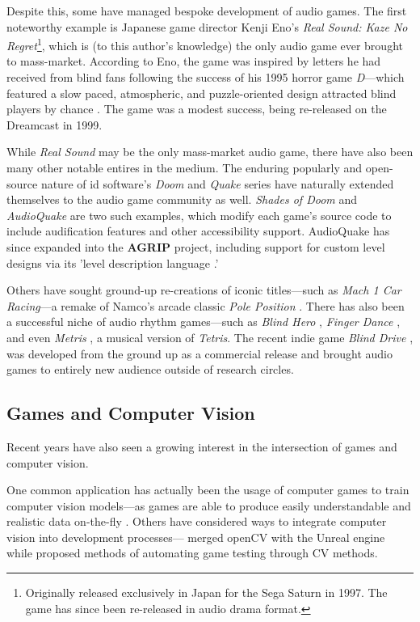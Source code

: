 \documentclass{report}
\newcommand{\tech}[1]{\textbf{#1}}
\begin{document}
Despite this, some have managed bespoke development of audio games. The first noteworthy example is Japanese game director Kenji Eno's \emph{Real Sound: Kaze No Regret}\footnote{Originally released exclusively in Japan for the Sega Saturn in 1997. The game has since been re-released in audio drama format.}, which is (to this author's knowledge) the only audio game ever brought to mass-market. According to Eno, the game was inspired by letters he had received from blind fans following the success of his 1995 horror game \emph{D}---which featured a slow paced, atmospheric, and puzzle-oriented design attracted blind players by chance \cite{Torres_2005}. The game was a modest success, being re-released on the Dreamcast in 1999.

While \emph{Real Sound} may be the only mass-market audio game, there have also been many other notable entires in the medium. The enduring popularly and open-source nature of id software's \emph{Doom} and \emph{Quake} series have naturally extended themselves to the audio game community as well. \emph{Shades of Doom} \cite{GMA_Games} and \emph{AudioQuake} \cite{atkinson2006making} are two such examples, which modify each game's source code to include audification features and other accessibility support. AudioQuake has since expanded into the \tech{AGRIP} project, including support for custom level designs via its 'level description language \cite{Atkinson2009}.'


Others have sought ground-up re-creations of iconic titles---such as \emph{Mach 1 Car Racing}---a remake of Namco's arcade classic \emph{Pole Position} \cite{friberg2004audio}. There has also been a successful niche of audio rhythm games---such as \emph{Blind Hero} \cite{yuan2008blind}, \emph{Finger Dance} \cite{miller2007finger}, and even \emph{Metris} \cite{metris}, a musical version of \emph{Tetris}. The recent indie game \emph{Blind Drive} \cite{blinddrive}, was developed from the ground up as a commercial release and brought audio games to entirely new audience outside of research circles.

\subsection{Games and Computer Vision}
Recent years have also seen a growing interest in the intersection of games and computer vision. 

One common application has actually been the usage of computer games to train computer vision models---as games are able to produce easily understandable and realistic data on-the-fly \cite{shafaei2016play} \cite{richter2016playing}. Others have considered ways to integrate computer vision into development processes---\cite{qiu2016unrealcv} merged openCV with the Unreal engine while \cite{paduraru2021automated} proposed methods of automating game testing through CV methods.
\end{document}
